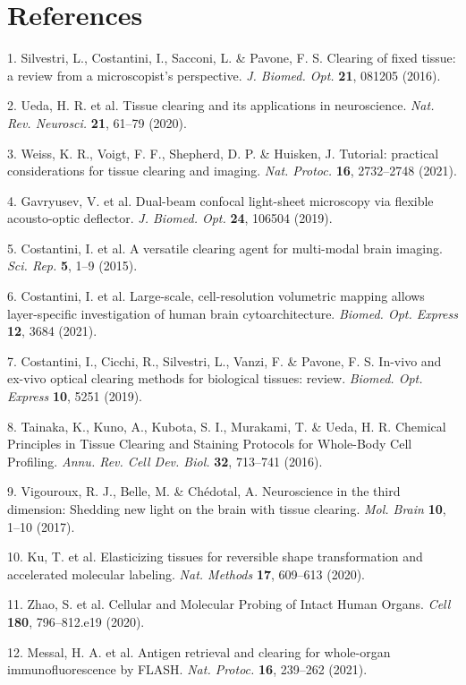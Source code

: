\documentclass{article}
\begin{document}
\section*{References}
\begin{hangpars}

1. Silvestri, L., Costantini, I., Sacconi, L. \& Pavone, F. S. Clearing of fixed tissue: a review from a microscopist’s perspective. \emph{J. Biomed. Opt.} \textbf{21}, 081205 (2016).

2. Ueda, H. R. et al. Tissue clearing and its applications in neuroscience. \emph{Nat. Rev. Neurosci.} \textbf{21}, 61–79 (2020).

3. Weiss, K. R., Voigt, F. F., Shepherd, D. P. \& Huisken, J. Tutorial: practical considerations for tissue clearing and imaging. \emph{Nat. Protoc.} \textbf{16}, 2732–2748 (2021).

4. Gavryusev, V. et al. Dual-beam confocal light-sheet microscopy via flexible acousto-optic deflector. \emph{J. Biomed. Opt.} \textbf{24}, 106504 (2019).

5. Costantini, I. et al. A versatile clearing agent for multi-modal brain imaging. \emph{Sci. Rep.} \textbf{5}, 1–9 (2015).

6. Costantini, I. et al. Large-scale, cell-resolution volumetric mapping allows layer-specific investigation of human brain cytoarchitecture. \emph{Biomed. Opt. Express} \textbf{12}, 3684 (2021).

7. Costantini, I., Cicchi, R., Silvestri, L., Vanzi, F. \& Pavone, F. S. In-vivo and ex-vivo optical clearing methods for biological tissues: review. \emph{Biomed. Opt. Express} \textbf{10}, 5251 (2019).

8. Tainaka, K., Kuno, A., Kubota, S. I., Murakami, T. \& Ueda, H. R. Chemical Principles in Tissue Clearing and Staining Protocols for Whole-Body Cell Profiling. \emph{Annu. Rev. Cell Dev. Biol.} \textbf{32}, 713–741 (2016).

9. Vigouroux, R. J., Belle, M. \& Chédotal, A. Neuroscience in the third dimension: Shedding new light on the brain with tissue clearing. \emph{Mol. Brain} \textbf{10}, 1–10 (2017).

10. Ku, T. et al. Elasticizing tissues for reversible shape transformation and accelerated molecular labeling. \emph{Nat. Methods} \textbf{17}, 609–613 (2020).

11. Zhao, S. et al. Cellular and Molecular Probing of Intact Human Organs. \emph{Cell} \textbf{180}, 796–812.e19 (2020).

12. Messal, H. A. et al. Antigen retrieval and clearing for whole-organ immunofluorescence by FLASH. \emph{Nat. Protoc.} \textbf{16}, 239–262 (2021).


\end{hangpars}
\end{document}
